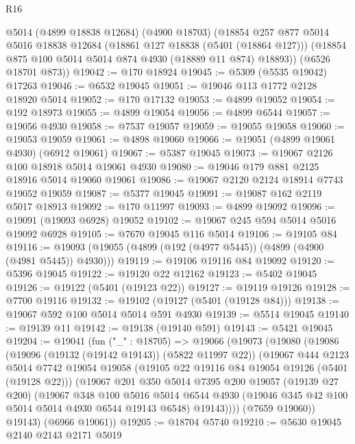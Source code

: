 \begin{lexlean}{R16}
\begin{coremodule}
      @5014
      (@4899 @18838 @12684)
      (@4900 @18703)
      (@18854
        @257
        @877
        @5014
        @5016
        @18838
        @12684
        (@18861 @127 @18838 (@5401 (@18864 @127)))
        (@18854 @875 @100 @5014 @5014 @874 @4930 (@18889 @11 @874) @18893))
      (@6526 @18701 @873))
@19042 := @170 @18924
@19045 := @5309 (@5535 @19042) @17263
@19046 := @6532 @19045
@19051 := @19046 @113 @1772 @2128 @18920 @5014
@19052 := @170 @17132
@19053 := @4899 @19052
@19054 := @192 @18973
@19055 := @4899 @19054
@19056 := @4899 @6544
@19057 := @19056 @4930
@19058 := @7537 @19057
@19059 := @19055 @19058
@19060 := @19053 @19059
@19061 := @4898 @19060
@19066 := @19051 (@4899 @19061 @4930) (@6912 @19061)
@19067 := @5387 @19045
@19073 := @19067 @2126 @100 @18918 @5014 @19061 @4930
@19080 := @19046 @179 @881 @2125 @18916 @5014 @19060 @19061
@19086 := @19067 @2120 @2124 @18914 @7743 @19052 @19059
@19087 := @5377 @19045
@19091 := @19087 @162 @2119 @5017 @18913
@19092 := @170 @11997
@19093 := @4899 @19092
@19096 := @19091 (@19093 @6928) @19052
@19102 := @19067 @245 @594 @5014 @5016 @19092 @6928
@19105 := @7670 @19045 @116 @5014
@19106 := @19105 @84
@19116 := @19093 (@19055 (@4899 (@192 (@4977 @5445)) (@4899 (@4900 (@4981 @5445)) @4930)))
@19119 := @19106 @19116 @84 @19092
@19120 := @5396 @19045
@19122 := @19120 @22 @12162
@19123 := @5402 @19045
@19126 := @19122 (@5401 (@19123 @22))
@19127 := @19119 @19126
@19128 := @7700 @19116
@19132 := @19102 (@19127 (@5401 (@19128 @84)))
@19138 := @19067 @592 @100 @5014 @5014 @591 @4930
@19139 := @5514 @19045
@19140 := @19139 @11
@19142 := @19138 (@19140 @591)
@19143 := @5421 @19045
@19204 := @19041
    (fun ("_" : @18705) =>
    @19066
      (@19073
        (@19080
          (@19086
            (@19096 (@19132 (@19142 @19143)) (@5822 @11997 @22))
            (@19067
              @444
              @2123
              @5014
              @7742
              @19054
              @19058
              (@19105 @22 @19116 @84 @19054 @19126 (@5401 (@19128 @22)))
              (@19067
                @201
                @350
                @5014
                @7395
                @200
                @19057
                (@19139 @27 @200)
                (@19067
                  @348
                  @100
                  @5016
                  @5014
                  @6544
                  @4930
                  (@19046 @345 @42 @100 @5014 @5014 @4930 @6544 @19143 @6548)
                  @19143))))
          (@7659 @19060))
        @19143)
      (@6966 @19061))
@19205 := @18704 @5740
@19210 := @5630 @19045 @2140 @2143 @2171 @5019

\end{coremodule}
\end{lexlean}
